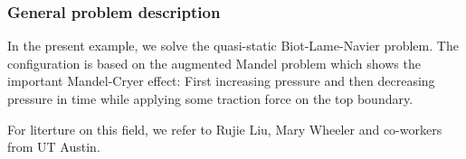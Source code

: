 \subsubsection{General problem description}

In the present example, we solve the quasi-static 
Biot-Lame-Navier problem. The configuration 
is based on the augmented Mandel problem which 
shows the important Mandel-Cryer effect: First increasing pressure
and then decreasing pressure in time while applying some 
traction force on the top boundary.  

For literture on this field, we refer to 
Rujie Liu, Mary Wheeler and co-workers from UT Austin.
